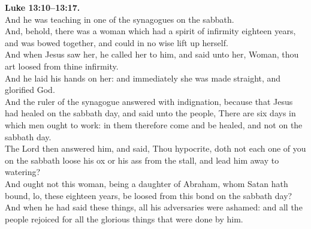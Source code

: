 \documentclass[12pt]{article} %
\begin{document}
{\begin{minipage}[t]{0.45\textwidth}
\textbf{Luke 13:10--13:17.}\\
And he was teaching in one of the synagogues on the sabbath.\\
And, behold, there was a woman which had a spirit of infirmity eighteen years, and was bowed together, and could in no wise lift up herself.\\
And when Jesus saw her, he called her to him, and said unto her, Woman, thou art loosed from thine infirmity.\\
And he laid his hands on her: and immediately she was made straight, and glorified God.\\
And the ruler of the synagogue answered with indignation, because that Jesus had healed on the sabbath day, and said unto the people, There are six days in which men ought to work: in them therefore come and be healed, and not on the sabbath day.\\
The Lord then answered him, and said, Thou hypocrite, doth not each one of you on the sabbath loose his ox or his ass from the stall, and lead him away to watering?\\
And ought not this woman, being a daughter of Abraham, whom Satan hath bound, lo, these eighteen years, be loosed from this bond on the sabbath day?\\
And when he had said these things, all his adversaries were ashamed: and all the people rejoiced for all the glorious things that were done by him.\\

\end{minipage}}
\vspace*{\fill}
\newpage
\huge%
\vspace*{\fill}
\begin{spacing}{1.0}
\end{spacing}
\vspace*{\fill}
\end{document}
